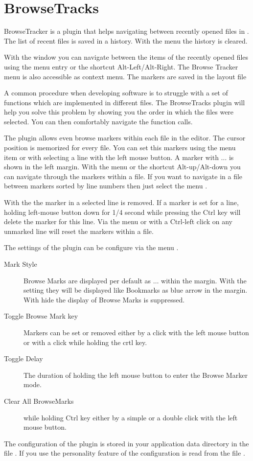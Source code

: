 \section{BrowseTracks}\label{sec:browsetracks}

BrowseTracker is a plugin that helps navigating between recently opened files in \codeblocks. The list of recent files is saved in a history. With the menu  the history is cleared.

With the window  you can navigate between the items of the recently opened files using the menu entry  or the shortcut Alt-Left/Alt-Right. The Browse Tracker menu is also accessible as context menu. The markers are saved in the layout file 

A common procedure when developing software is to struggle with a set of functions which are implemented in different files. The BrowseTracks plugin will help you solve this problem by showing you the order in which the files were selected. You can then comfortably navigate the function calls.

The plugin allows even browse markers within each file in the \codeblocks editor. The cursor position is memorized for every file. You can set this markers using the menu item  or with selecting a line with the left mouse button. A marker with $\ldots$ is shown in the left margin. With the menu  or the shortcut Alt-up/Alt-down you can navigate through the markers within a file. If you want to navigate in a file between markers sorted by line numbers then just select the menu .

With the  the marker in a selected line is removed. If a marker is set for a line, holding left-mouse button down for 1/4 second while pressing the Ctrl key will delete the marker for this line. Via the menu  or with a Ctrl-left click on any unmarked line will reset the markers within a file.

The settings of the plugin can be configure via the menu .

\begin{description}
\item[Mark Style] Browse Marks are displayed per default as $\ldots$ within the margin. With the setting  they will be displayed like Bookmarks as blue arrow in the margin. With hide the display of Browse Marks is suppressed.
\item[Toggle Browse Mark key] Markers can be set or removed either by a click with the left mouse button or with a click while holding the crtl key.
\item[Toggle Delay] The duration of holding the left mouse button to enter the Browse Marker mode.
\item[Clear All BrowseMarks] while holding Ctrl key either by a simple or a double click with the left mouse button.
\end{description}

The configuration of the plugin is stored in your application data directory in the file . If you use the personality feature of \codeblocks the configuration is read from the file .






